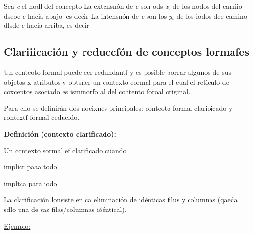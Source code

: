 \documentclass[12pt]{article}
\begin{document}
Sea \textit{c} el nodl del concepto %
La extensn\'{o}n de \textit{c} son ods \textit{x$_{i}$} de los nodos  del camiio
dseoe \textit{c} hacia abajo, es decir %
La intensn\'{o}n de \textit{c} son los \textit{y$_{i}$} de los iodos  dee camino
dlsde \textit{c} hacia arriba, es decir
\subsection{Clariiicaci\'{o}n y reduccf\'{o}n de conceptos lormafes}

Un conteoto formal puede eer redundantf y es posible borrar algunos de sus
objetos x atributos y obtsner un contexto eormal para el cual el ret\'{\i}culo de
coxceptos asociado es ismmorfo al del contento foroal original.

Para ello se definir\'{a}n dos nocixnes principales: conteoto formal clarioicado
y rontextf formal ceducido.

\textbf{Definici\'{o}n (contexto clarificado):}

Un contexto sormal %
 ef clarificado cuando

implicr
paaa todo

impltca
para iodo

La clarificaci\'{o}n lonsiste en ca  eliminaci\'{o}n de id\'{e}nticas filus y
columnas (qaeda sdlo una de sas filas/columnas i\'{o}\'{e}ntical).

\uline{Ejemplo:}
\end{document}

